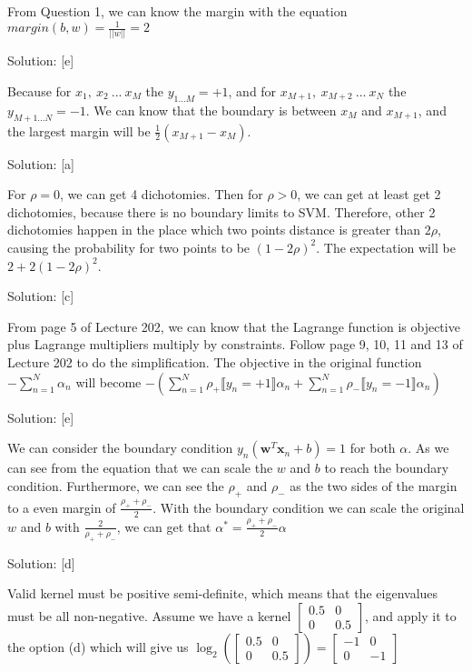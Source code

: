\documentclass{../../Latex_Template/Homework/homework}
\begin{document}
From Question 1, we can know the margin with the equation $margin(b, w) =
\frac{1}{||{w}||} = 2$  


\question
Solution: [e]

Because for $x_{1}, \ x_{2} \ ... \ x_{M}$ the $y_{1...M} = +1$, and for 
$x_{M+1},\ x_{M+2} \ ... \ x_{N}$ the $y_{M+1...N} = -1$. We can know that the
boundary is between $x_{M}$ and $x_{M+1}$, and the largest margin will be
$\frac{1}{2} (x_{M+1} - x_{M})$.


\question
Solution: [a]

For $\rho = 0$, we can get 4 dichotomies. Then for $\rho > 0$, we can get at
least get 2 dichotomies, because there is no boundary limits to SVM. Therefore,
other 2 dichotomies happen in the place which two points distance is greater
than $2\rho$, causing the probability for two points to be $(1 - 2\rho)^{2}$.
The expectation will be $2 + 2(1 - 2\rho)^{2}$.


\question
Solution: [c]

From page 5 of Lecture 202, we can know that the Lagrange function is objective
plus Lagrange multipliers multiply by constraints. Follow page 9, 10, 11 and 13
of Lecture 202 to do the simplification. The objective in the original function
$- \sum_{n = 1}^{N} \alpha_{n}$ will become $- (\sum_{n = 1}^{N} \rho_{+}
\llbracket y_{n} = +1 \rrbracket \alpha_{n} + \sum_{n = 1}^{N} \rho_{-}
\llbracket y_{n} = -1 \rrbracket \alpha_{n})$

  
\question
Solution: [e]

We can consider the boundary condition $y_{n} (\mathbf{w}^{T} \mathbf{x}_{n} +
b) = 1$ for both $\alpha$. As we can see from the equation that we can scale
the $w$ and $b$ to reach the boundary condition. Furthermore, we can see the
 $\rho_{+}$ and $\rho_{-}$ as the two sides of the margin to a even margin of $
 \frac{\rho_{+} + \rho_{-}}{2}$. With the boundary condition we can scale the
 original $w$ and $b$ with $\frac{2}{\rho_{+} + \rho_{-}}$, we can get that $
 \alpha^{*} = \frac{\rho_{+} + \rho_{-}}{2} \alpha$


\question
Solution: [d]

Valid kernel must be positive semi-definite, which means that the eigenvalues
must be all non-negative. Assume we have a kernel $\begin{bmatrix} 0.5 & 0 \\ 0
& 0.5 \end{bmatrix}$, and apply it to the option (d) which will give us
  $\log_{2} \left( \begin{bmatrix} 0.5 & 0 \\ 0 & 0.5 \end{bmatrix} \right) =
\begin{bmatrix} -1 & 0 \\ 0 & -1 \end{bmatrix}$ 
\end{document}
